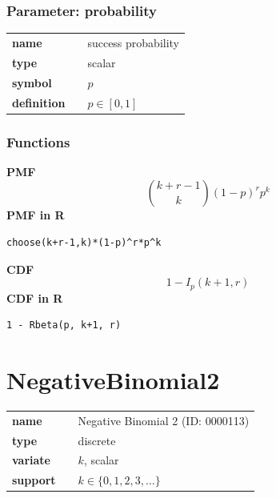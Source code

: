 \documentclass{article}
\begin{document}
\subsubsection*{Parameter: probability}

\noindent\begin{tabular}{p{2cm}cl}
\textbf{name} & & success probability \\
\textbf{type} & & scalar \\
\textbf{symbol} & & $p$  \\
\textbf{definition} & & $p \in [0,1]$
\end{tabular}
\subsubsection*{Functions}

\smallskip \noindent \hspace{.2cm} \textbf{PMF} 
\begin{equation*}\binom {k+r-1}k (1-p)^r p^k\end{equation*}
\smallskip \noindent \hspace{.2cm} \textbf{PMF in R}  
\begin{verbatim}choose(k+r-1,k)*(1-p)^r*p^k\end{verbatim}
\smallskip \noindent \hspace{.2cm} \textbf{CDF} 
\begin{equation*}1 - I_{p}(k+1, r)\end{equation*}
\smallskip \noindent \hspace{.2cm} \textbf{CDF in R} 
\begin{verbatim}1 - Rbeta(p, k+1, r)\end{verbatim}
\smallskip\section*{NegativeBinomial2} 

  \bigskip 

\begin{tabular}{p{2cm}cl}
\textbf{name} & & Negative Binomial 2 (ID: 0000113)\\ 
 
\textbf{type} & & discrete \\ 

\textbf{variate} & & $k$, scalar \\ 

\textbf{support} & & $k \in \{0,1,2,3,\dots\}$
\end{tabular}
\end{document}
